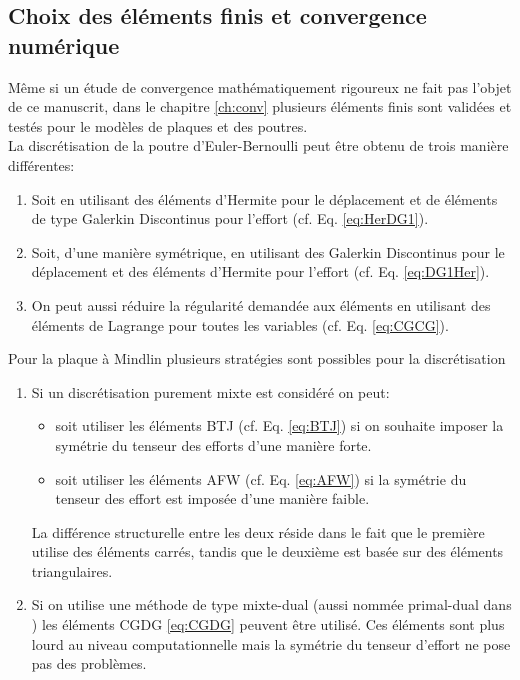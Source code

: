 \subsection*{Choix des éléments finis et convergence numérique}

Même si un étude de convergence mathématiquement rigoureux ne fait pas l'objet de ce manuscrit, dans le chapitre \ref{ch:conv} plusieurs éléments finis sont validées et testés pour le modèles de plaques et des poutres. \\

La discrétisation de la poutre d'Euler-Bernoulli peut être obtenu de trois manière différentes:
\begin{enumerate}
\item Soit en utilisant des éléments d'Hermite pour le déplacement et de éléments de type Galerkin Discontinus pour l'effort (cf. Eq. \eqref{eq:HerDG1}). 
\item Soit, d'une manière symétrique, en utilisant des Galerkin Discontinus pour le déplacement et des éléments d'Hermite pour l'effort (cf. Eq. \eqref{eq:DG1Her}). 
\item On peut aussi réduire la régularité demandée aux éléments en utilisant des éléments de Lagrange pour toutes les variables (cf. Eq. \eqref{eq:CGCG}).
\end{enumerate}
 
Pour la plaque à Mindlin plusieurs stratégies sont possibles pour la discrétisation
\begin{enumerate}
	\item Si un discrétisation purement mixte est considéré on peut:
	\begin{itemize}
		\item soit utiliser les éléments BTJ (cf. Eq. \eqref{eq:BTJ}) si on souhaite imposer la symétrie du tenseur des efforts d'une manière forte.
		\item soit utiliser les éléments AFW (cf. Eq. \eqref{eq:AFW}) si la symétrie du tenseur des effort est imposée d'une manière faible.
	\end{itemize}  
	La différence structurelle entre les deux réside dans le fait que le première utilise des éléments carrés, tandis que le deuxième est basée sur des éléments triangulaires.
	\item Si on utilise une méthode de type mixte-dual (aussi nommée primal-dual dans \cite{joly2003variational}) les éléments CGDG \eqref{eq:CGDG} peuvent être utilisé. Ces éléments sont plus lourd au niveau computationnelle mais la symétrie du tenseur d'effort ne pose pas des problèmes.
\end{enumerate}

